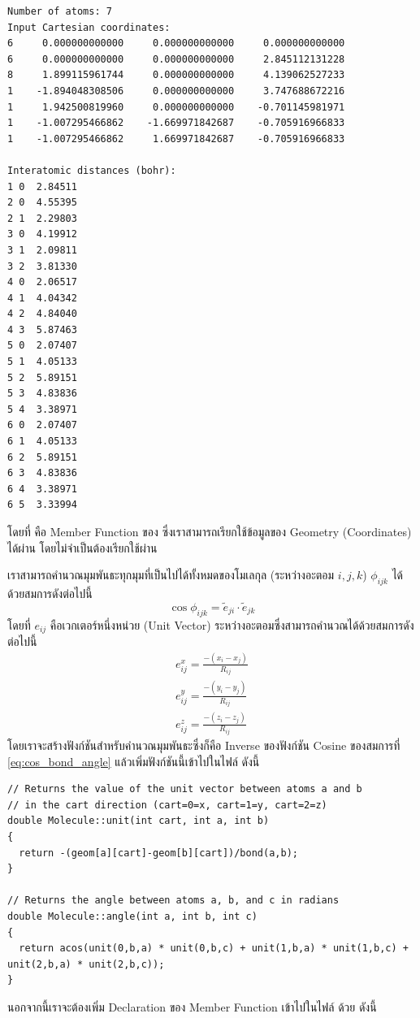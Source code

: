 \begin{lstlisting}[style=MyC++]
Number of atoms: 7
Input Cartesian coordinates:
6     0.000000000000     0.000000000000     0.000000000000
6     0.000000000000     0.000000000000     2.845112131228
8     1.899115961744     0.000000000000     4.139062527233
1    -1.894048308506     0.000000000000     3.747688672216
1     1.942500819960     0.000000000000    -0.701145981971
1    -1.007295466862    -1.669971842687    -0.705916966833
1    -1.007295466862     1.669971842687    -0.705916966833

Interatomic distances (bohr):
1 0  2.84511
2 0  4.55395
2 1  2.29803
3 0  4.19912
3 1  2.09811
3 2  3.81330
4 0  2.06517
4 1  4.04342
4 2  4.84040
4 3  5.87463
5 0  2.07407
5 1  4.05133
5 2  5.89151
5 3  4.83836
5 4  3.38971
6 0  2.07407
6 1  4.05133
6 2  5.89151
6 3  4.83836
6 4  3.38971
6 5  3.33994
\end{lstlisting}
%
\vspace{5pt}
%
โดยที่  คือ Member Function ของ  ซึ่งเราสามารถเรียกใช้ข้อมูลของ Geometry (Coordinates) ได้ผ่าน  โดยไม่จำเป็นต้องเรียกใช้ผ่าน 

\noindent {}

เราสามารถคำนวณมุมพันธะทุกมุมที่เป็นไปได้ทั้งหมดของโมเลกุล (ระหว่างอะตอม $i, j, k$) $\phi_{ijk}$ ได้ด้วยสมการดังต่อไปนี้
%
\begin{equation}
  \label{eq:cos_bond_angle}
  \cos \phi_{ijk} = \tilde{e}_{ji} \cdot \tilde{e}_{jk}
\end{equation}
%
โดยที่ $e_{ij}$ คือเวกเตอร์หนึ่งหน่วย (Unit Vector) ระหว่างอะตอมซึ่งสามารถคำนวณได้ด้วยสมการดังต่อไปนี้
%
\begin{align}
  e^{x}_{ij}
  = \frac{
    -(x_{i} - x_{j})
  }
  {
    R_{ij}
  } \\
  e^{y}_{ij}
  = \frac{
    -(y_{i} - y_{j})
  }
  {
    R_{ij}
  } \\
  e^{z}_{ij}
  = \frac{
    -(z_{i} - z_{j})
  }
  {
    R_{ij}
  }
\end{align}
%
\vspace{5pt}
%
โดยเราจะสร้างฟังก์ชันสำหรับคำนวณมุมพันธะซึ่งก็คือ Inverse ของฟังก์ชัน Cosine ของสมการที่ \eqref{eq:cos_bond_angle} แล้วเพิ่มฟังก์ชันนี้เข้าไปในไฟล์  ดังนี้

\vspace{5pt}

\begin{lstlisting}[style=MyC++]
// Returns the value of the unit vector between atoms a and b
// in the cart direction (cart=0=x, cart=1=y, cart=2=z)
double Molecule::unit(int cart, int a, int b)
{
  return -(geom[a][cart]-geom[b][cart])/bond(a,b);
}

// Returns the angle between atoms a, b, and c in radians
double Molecule::angle(int a, int b, int c)
{
  return acos(unit(0,b,a) * unit(0,b,c) + unit(1,b,a) * unit(1,b,c) + unit(2,b,a) * unit(2,b,c));
}
\end{lstlisting}
%
\vspace{5pt}
%
นอกจากนี้เราจะต้องเพิ่ม Declaration ของ Member Function เข้าไปในไฟล์  ด้วย ดังนี้


